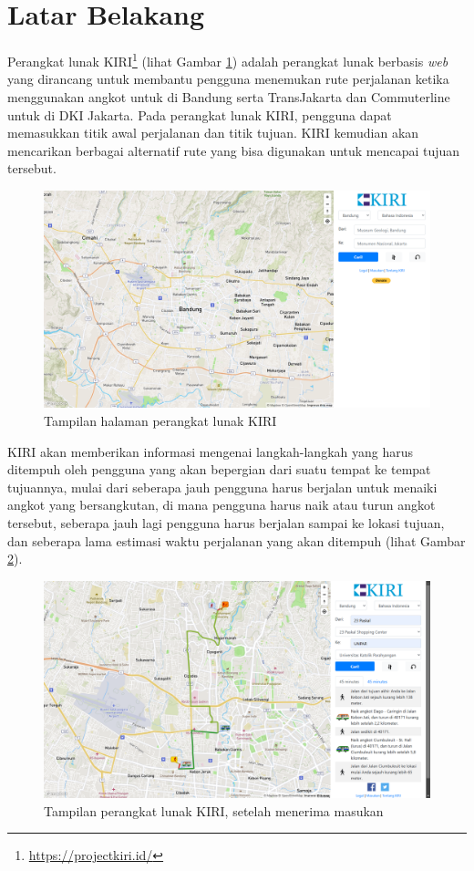 \documentclass[a4paper,twoside]{article}
\begin{document}
\section{Latar Belakang}
Perangkat lunak KIRI\footnote{\url{https://projectkiri.id/}} (lihat Gambar \ref{fig:kiri}) adalah perangkat lunak berbasis \textit{web} yang dirancang untuk membantu pengguna menemukan rute perjalanan ketika menggunakan angkot untuk di Bandung serta TransJakarta dan Commuterline untuk di DKI Jakarta. Pada perangkat lunak KIRI, pengguna dapat memasukkan titik awal perjalanan dan titik tujuan. KIRI kemudian akan mencarikan berbagai alternatif rute yang bisa digunakan untuk mencapai tujuan tersebut.
\begin{figure}[h] 
	\centering  
	\includegraphics[width=1\textwidth]{Gambar/KIRI.png}  
	\caption{Tampilan halaman perangkat lunak KIRI}
	\label{fig:kiri} 
\end{figure}
\newpage
\noindent
KIRI akan memberikan informasi mengenai langkah-langkah yang harus ditempuh oleh pengguna yang akan bepergian dari suatu tempat ke tempat tujuannya, mulai dari seberapa jauh pengguna harus berjalan untuk menaiki angkot yang bersangkutan, di mana pengguna harus naik atau turun angkot tersebut, seberapa jauh lagi pengguna harus berjalan sampai ke lokasi tujuan, dan seberapa lama estimasi waktu perjalanan yang akan ditempuh (lihat Gambar \ref{fig:kiri2}).
\begin{figure}[H] 
	\centering  
	\includegraphics[width=1\textwidth]{Gambar/KIRI-2.png}  
	\caption{Tampilan perangkat lunak KIRI, setelah menerima masukan}
	\label{fig:kiri2} 
\end{figure}
\end{document}
